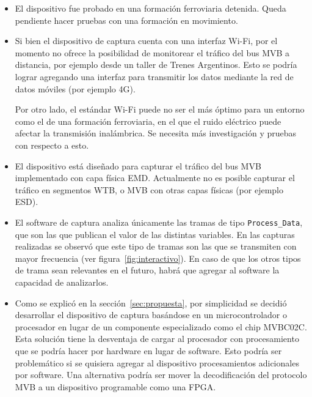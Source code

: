 \begin{itemize}
    \item El dispositivo fue probado en una formación ferroviaria detenida. Queda pendiente hacer pruebas con una formación en movimiento.

    \item Si bien el dispositivo de captura cuenta con una interfaz Wi-Fi, por el momento no ofrece la posibilidad de monitorear el tráfico del bus MVB a distancia, por ejemplo desde un taller de Trenes Argentinos. Esto se podría lograr agregando una interfaz para transmitir los datos mediante la red de datos móviles (por ejemplo 4G).

    Por otro lado, el estándar Wi-Fi puede no ser el más óptimo para un entorno como el de una formación ferroviaria, en el que el ruido eléctrico puede afectar la transmisión inalámbrica. Se necesita más investigación y pruebas con respecto a esto.

    \item El dispositivo está diseñado para capturar el tráfico del bus MVB implementado con capa física EMD. Actualmente no es posible capturar el tráfico en segmentos WTB, o MVB con otras capas físicas (por ejemplo ESD).

    \item El software de captura analiza únicamente las tramas de tipo \texttt{Process\_Data}, que son las que publican el valor de las distintas variables. En las capturas realizadas se observó que este tipo de tramas son las que se transmiten con mayor frecuencia (ver figura~\ref{fig:interactivo}). En caso de que los otros tipos de trama sean relevantes en el futuro, habrá que agregar al software la capacidad de analizarlos.

    \item Como se explicó en la sección~\ref{sec:propuesta}, por simplicidad se decidió desarrollar el dispositivo de captura basándose en un microcontrolador o procesador en lugar de un componente especializado como el chip MVBC02C.
    Esta solución tiene la desventaja de cargar al procesador con procesamiento que se podría hacer por hardware en lugar de software. Esto podría ser problemático si se quisiera agregar al dispositivo procesamientos adicionales por software.
    Una alternativa podría ser mover la decodificación del protocolo MVB a un dispositivo programable como una FPGA.
\end{itemize}

